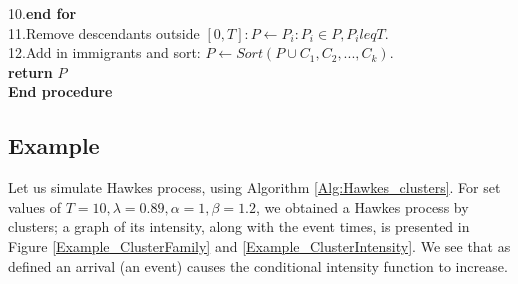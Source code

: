 \begin{breakablealgorithm}
\begin{algorithmic}[H]
\begin{tabbing}
			10.\hspace{0.5cm}\textbf{end for}
			\\
			11.\hspace{0.5cm}Remove descendants outside $[0, T]: P \leftarrow {P_{i} : P_{i} \in P, P_{i} leq T}$.
			\\
			12.\hspace{0.5cm}Add in immigrants and sort: $P \leftarrow Sort(P \cup {C_{1}, C_{2}, . . . , C_{k}})$.
			\\
			\hspace{0.5cm}\textbf{return} $P$
			\\
			\hspace{0.2cm}\textbf{End procedure}
		\end{tabbing}
	\end{algorithmic}
\end{breakablealgorithm}

\subsection{Example}

Let us simulate Hawkes process, using Algorithm \ref{Alg:Hawkes_clusters}. For set values of $T=10, \lambda=0.89, \alpha=1, \beta=1.2$, we obtained a Hawkes process by clusters; a graph of its intensity, along with the event times, is presented in Figure \ref{Example_ClusterFamily} and \ref{Example_ClusterIntensity}. We see that as defined an arrival (an event) causes the conditional intensity function to increase.


